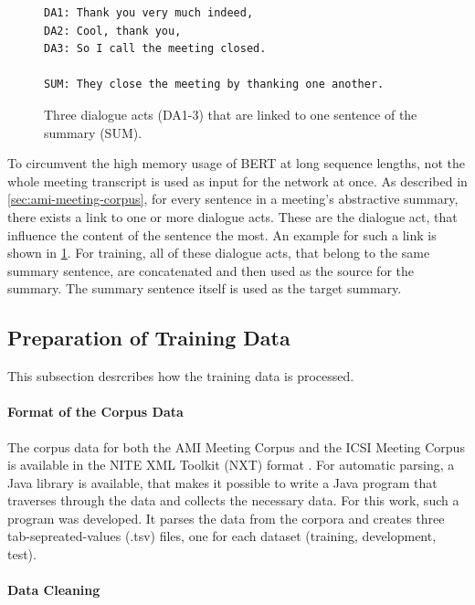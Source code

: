 \begin{figure}[h]
\begin{lstlisting}[numbers=none]
DA1: Thank you very much indeed,
DA2: Cool, thank you,
DA3: So I call the meeting closed.

SUM: They close the meeting by thanking one another.
\end{lstlisting}
\caption{Three dialogue acts (DA1-3) that are linked to one sentence of the summary (SUM).}
\label{fig:dialogue-arc-summary-link-example}
\end{figure}

To circumvent the high memory usage of BERT at long sequence lengths, not the whole meeting transcript is used as input for the network at once.
As described in \cref{sec:ami-meeting-corpus}, for every sentence in a meeting's abstractive summary, there exists a link to one or more dialogue acts.
These are the dialogue act, that influence the content of the sentence the most.
An example for such a link is shown in \cref{fig:dialogue-arc-summary-link-example}.
For training, all of these dialogue acts, that belong to the same summary sentence, are concatenated and then used as the source for the summary.
The summary sentence itself is used as the target summary.

\subsection{Preparation of Training Data}

This subsection desrcribes how the training data is processed.

\paragraph{Format of the Corpus Data}

The corpus data for both the AMI Meeting Corpus and the ICSI Meeting Corpus is available in the NITE XML Toolkit (NXT) format \cite{Carletta2003}.
For automatic parsing, a Java library is available, that makes it possible to write a Java program that traverses through the data and collects the necessary data.
For this work, such a program was developed.
It parses the data from the corpora and creates three tab-sepreated-values (.tsv) files, one for each dataset (training, development, test).

\paragraph{Data Cleaning}

